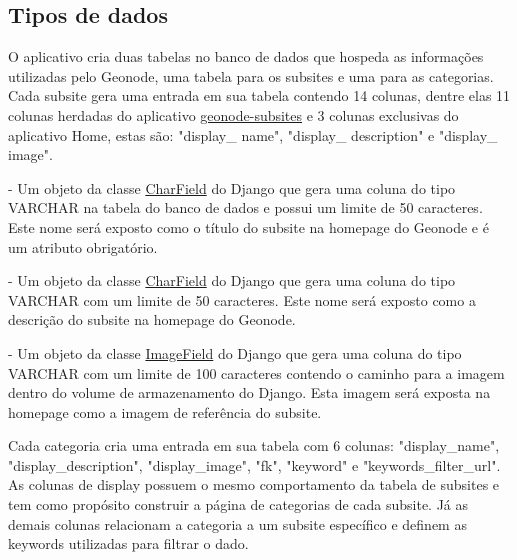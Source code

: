 \documentclass[12pt]{article}
\begin{document}
\subsection{Tipos de dados}\label{sec:tiposDeDados}

O aplicativo cria duas tabelas no banco de dados que hospeda as informações
utilizadas pelo Geonode, uma tabela para os subsites e uma para as categorias.
Cada subsite gera uma entrada em sua tabela contendo 14 colunas, dentre elas 11
colunas herdadas do aplicativo \textcolor{blue}{
\href{https://github.com/geosolutions-it/geonode-subsites}{geonode-subsites}} e
3 colunas exclusivas do aplicativo Home, estas são: "display\_ name",
"display\_ description" e "display\_ image". 

\begin{description}
  \setlength\itemsep{1em}
  \item[display\_name]
    - Um objeto da classe 
      \textcolor{blue}
      {\href{https://docs.djangoproject.com/en/5.0/ref/models/fields/#django.db.models.CharField}
      {CharField}} do Django que gera uma coluna do tipo VARCHAR na tabela do
      banco de dados e possui um limite de 50 caracteres. Este nome será
      exposto como o título do subsite na homepage do Geonode e é um atributo
      obrigatório.
    
  \item[display\_description]
  - Um objeto da classe 
      \textcolor{blue}
      {\href{https://docs.djangoproject.com/en/5.0/ref/models/fields/#django.db.models.CharField}
      {CharField}} 
    do Django que gera uma coluna do tipo VARCHAR com um limite de
    50 caracteres. Este nome será exposto como a descrição do subsite na
    homepage do Geonode.

  \item[display\_image]
  - Um objeto da classe
      \textcolor{blue}
      {\href{https://docs.djangoproject.com/en/5.0/ref/models/fields/#django.db.models.ImageField}
      {ImageField}} 
    do Django que gera uma coluna do tipo VARCHAR com um limite
    de 100 caracteres contendo o caminho para a imagem dentro do volume de
    armazenamento do Django. Esta imagem será exposta na homepage como a imagem
    de referência do subsite. 
\end{description}

Cada categoria cria uma entrada em sua tabela com 6 colunas: "display\_name",
"display\_description", "display\_image", "fk", "keyword" e
"keywords\_filter\_url". As colunas de display possuem o mesmo comportamento da
tabela de subsites e tem como propósito construir a página de categorias de
cada subsite. Já as demais colunas relacionam a categoria a um subsite
específico e definem as keywords utilizadas para filtrar o dado.
\end{document}
